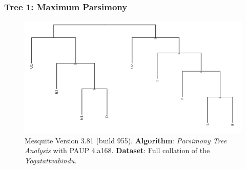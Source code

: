 \subsubsection{Tree 1: Maximum Parsimony} 

  \begin{figure}[H]
    \centering
    \includegraphics[width=1\textwidth]{pics/paup-tree.png} %
    \caption{Mesquite Version 3.81 (build 955). \textbf{Algorithm}: \textit{Parsimony Tree Analysis} with PAUP 4.a168. \textbf{Dataset}: Full collation of the \emph{Yogatattvabindu}.}
    \label{fig:paup-tree}
\end{figure}

